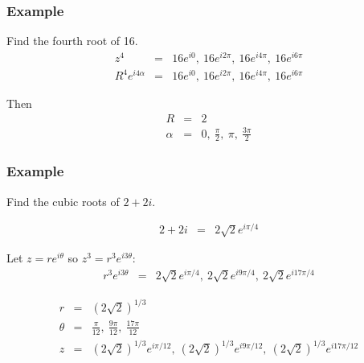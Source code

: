 \begin{frame}
  \frametitle{Example}

  Find the fourth root of 16.
  \begin{eqnarray*}
    z^4 & = & 16 e^{i0}, ~ 16 e^{i2\pi}, ~ 16 e^{i4\pi}, ~ 16 e^{i6\pi} \\
    R^4 e^{i4\alpha} & = & 16 e^{i0}, ~ 16 e^{i2\pi}, ~ 16 e^{i4\pi}, ~ 16 e^{i6\pi} 
  \end{eqnarray*}

  Then
  \begin{eqnarray*}
    R & = & 2 \\
    \alpha & = & 0, ~ \frac{\pi}{2}, ~ \pi, ~ \frac{3\pi}{2}
  \end{eqnarray*}

\end{frame}



\begin{frame}
  \frametitle{Example}

  Find the cubic roots of $2+2i$.

  \begin{eqnarray*}
    2 + 2i & = & 2\sqrt{2} e^{i\pi/4}
  \end{eqnarray*}

  Let $z=re^{i\theta}$ so $z^3=r^3e^{i3\theta}$:
  \begin{eqnarray*}
    r^3e^{i3\theta} & = & 2\sqrt{2} e^{i\pi/4}, ~ 2\sqrt{2} e^{i9\pi/4}, ~ 2\sqrt{2} e^{i17\pi/4}
  \end{eqnarray*}

  \begin{eqnarray*}
    r &  = & (2\sqrt{2})^{1/3} \\
    \theta & = & \frac{\pi}{12}, ~ \frac{9\pi}{12}, ~ \frac{17\pi}{12} \\
    z & = &  (2\sqrt{2})^{1/3} e^{i\pi/12}, ~ (2\sqrt{2})^{1/3} e^{i9\pi/12}, ~ (2\sqrt{2})^{1/3} e^{i17\pi/12}
  \end{eqnarray*}

\end{frame}



